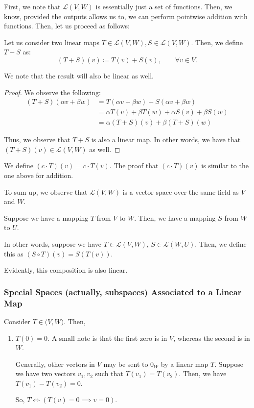 \documentclass[openany]{book}
\begin{document}
First, we note that $\mathcal L (V,W)$ is essentially just a set of functions. Then, we know, provided the outputs allows us to, we can perform pointwise addition with functions. Then, let us proceed as follows:

\begin{thm}
	Let us consider two linear maps $T \in \mathcal L(V,W), S \in \mathcal L(V,W)$. Then, we define $T + S$ as:
	\begin{equation*}
		(T+S)(v) \coloneq T(v) + S(v), \qquad \forall v \in V.
	\end{equation*}

	We note that the result will also be linear as well.
\end{thm}
\begin{proof}
	We observe the following:
	\begin{align*}
		(T+S)(\alpha v + \beta w) &= T(\alpha v + \beta w) + S(\alpha v + \beta w) \\
		&= \alpha T(v) + \beta T(w) + \alpha S (v) + \beta S(w) \\
		&= \alpha (T+S)(v) + \beta (T+S)(w) 
	\end{align*}

	Thus, we observe that $T+S$ is also a linear map. In other words, we have that $(T+S)(v) \in \mathcal L(V,W)$ as well.
\end{proof}

\begin{thm}
	We define $(c \cdot T)(v) = c \cdot T(v)$. The proof that $(c \cdot T)(v)$ is similar to the one above for addition.
\end{thm}

To sum up, we observe that $\mathcal L (V,W)$ is a vector space over the same field as $V$ and $W$.

\begin{defn}
	Suppose we have a mapping $T$ from $V$ to $W$. Then, we have a mapping $S$ from $W$ to $U$.
	
	In other words, suppose we have $T \in \mathcal L (V,W)$, $S \in \mathcal L (W, U)$. Then, we define this as $(S \circ T)(v) = S(T(v))$.
	
	Evidently, this composition is also linear.
\end{defn}

\subsubsection{Special Spaces (actually, subspaces) Associated to a Linear Map}
Consider $T \in \mathcal (V,W)$. Then,
\begin{enumerate}
	\item $T(0) = 0$. A small note is that the first zero is in $V$, whereas the second is in $W$. 
	
	Generally, other vectors in $V$ may be sent to $0_{W}$ by a linear map $T$. Suppose we have two vectors $v_{1}, v_{2}$ such that $T(v_{1}) = T(v_{2})$. Then, we have $T(v_{1}) - T(v_{2}) = 0$.
	
	So, $T \iff (T(v) = 0 \implies v = 0)$.
\end{enumerate}
\end{document}
